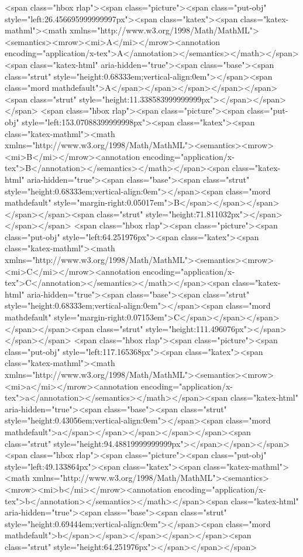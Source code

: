 <span class="hbox rlap"><span class="picture"><span class="put-obj" style="left:26.456695999999997px"><span class="katex"><span class="katex-mathml"><math xmlns="http://www.w3.org/1998/Math/MathML"><semantics><mrow><mi>A</mi></mrow><annotation encoding="application/x-tex">A</annotation></semantics></math></span><span class="katex-html" aria-hidden="true"><span class="base"><span class="strut" style="height:0.68333em;vertical-align:0em"></span><span class="mord mathdefault">A</span></span></span></span></span><span class="strut" style="height:11.338583999999999px"></span></span></span>
<span class="hbox rlap"><span class="picture"><span class="put-obj" style="left:153.07088399999998px"><span class="katex"><span class="katex-mathml"><math xmlns="http://www.w3.org/1998/Math/MathML"><semantics><mrow><mi>B</mi></mrow><annotation encoding="application/x-tex">B</annotation></semantics></math></span><span class="katex-html" aria-hidden="true"><span class="base"><span class="strut" style="height:0.68333em;vertical-align:0em"></span><span class="mord mathdefault" style="margin-right:0.05017em">B</span></span></span></span></span><span class="strut" style="height:71.811032px"></span></span></span>
<span class="hbox rlap"><span class="picture"><span class="put-obj" style="left:64.251976px"><span class="katex"><span class="katex-mathml"><math xmlns="http://www.w3.org/1998/Math/MathML"><semantics><mrow><mi>C</mi></mrow><annotation encoding="application/x-tex">C</annotation></semantics></math></span><span class="katex-html" aria-hidden="true"><span class="base"><span class="strut" style="height:0.68333em;vertical-align:0em"></span><span class="mord mathdefault" style="margin-right:0.07153em">C</span></span></span></span></span><span class="strut" style="height:111.496076px"></span></span></span>
<span class="hbox rlap"><span class="picture"><span class="put-obj" style="left:117.165368px"><span class="katex"><span class="katex-mathml"><math xmlns="http://www.w3.org/1998/Math/MathML"><semantics><mrow><mi>a</mi></mrow><annotation encoding="application/x-tex">a</annotation></semantics></math></span><span class="katex-html" aria-hidden="true"><span class="base"><span class="strut" style="height:0.43056em;vertical-align:0em"></span><span class="mord mathdefault">a</span></span></span></span></span><span class="strut" style="height:94.48819999999999px"></span></span></span>
<span class="hbox rlap"><span class="picture"><span class="put-obj" style="left:49.133864px"><span class="katex"><span class="katex-mathml"><math xmlns="http://www.w3.org/1998/Math/MathML"><semantics><mrow><mi>b</mi></mrow><annotation encoding="application/x-tex">b</annotation></semantics></math></span><span class="katex-html" aria-hidden="true"><span class="base"><span class="strut" style="height:0.69444em;vertical-align:0em"></span><span class="mord mathdefault">b</span></span></span></span></span><span class="strut" style="height:64.251976px"></span></span></span>
